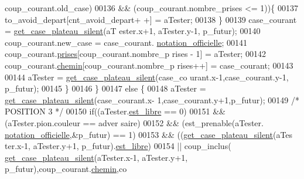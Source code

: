 \begin{DoxyCode}
      coup\_courant.old\_case)
00136                                                 && (coup\_courant.nombre\_prises <=
       1))\{
00137                                                 to\_avoid\_depart[cnt\_avoid\_depart+
      +] = aTester;
00138                                         \}
00139                                         case\_courant = \hyperlink{plateau_8h_a60a8f706865d0ae9087f8d65d4667655}{get_case_plateau_silent}(aT
      ester.x+1, aTester.y-1, p\_futur);
00140                                         coup\_courant.new\_case = case\_courant.
      \hyperlink{structcase__plateau_ad510581b324604a9cf685cbb769a421a}{notation_officielle};
00141                                         coup\_courant.\hyperlink{structcoup_ae19b3a66d3f4e66b8f69a38e4005f44a}{prises}[coup\_courant.nombre\_p
      rises - 1] = aTester;
00142                                         coup\_courant.\hyperlink{structcoup_aa66b88eb8140c2f459ac92fad0796510}{chemin}[coup\_courant.nombre\_p
      rises++] = case\_courant;
00143 
00144                                         aTester = \hyperlink{plateau_8h_a60a8f706865d0ae9087f8d65d4667655}{get_case_plateau_silent}(case\_co
      urant.x-1,case\_courant.y-1, p\_futur);
00145                                 \}
00146                         \}
00147                         \textcolor{keywordflow}{else} \{
00148                                 aTester = \hyperlink{plateau_8h_a60a8f706865d0ae9087f8d65d4667655}{get_case_plateau_silent}(case\_courant.x-
      1,case\_courant.y+1,p\_futur);
00149                                 \textcolor{comment}{/* POSITION 3 */}
00150                                 \textcolor{keywordflow}{if}((aTester.\hyperlink{structcase__plateau_a173f25d2fd7c653d77ca8174ba4f636d}{est_libre} == 0)
00151                                                 && (aTester.pion.couleur == adver
      saire)
00152                                                 && (est\_prenable(aTester.
      \hyperlink{structcase__plateau_ad510581b324604a9cf685cbb769a421a}{notation_officielle},&p\_futur) == 1)
00153                                                 && ((\hyperlink{plateau_8h_a60a8f706865d0ae9087f8d65d4667655}{get_case_plateau_silent}(aTes
      ter.x-1, aTester.y+1, p\_futur).\hyperlink{structcase__plateau_a173f25d2fd7c653d77ca8174ba4f636d}{est_libre})
00154                                                                 || coup\_inclus(
      \hyperlink{plateau_8h_a60a8f706865d0ae9087f8d65d4667655}{get_case_plateau_silent}(aTester.x-1, aTester.y+1, p\_futur),coup\_courant.\hyperlink{structcoup_aa66b88eb8140c2f459ac92fad0796510}{chemin},co

\end{DoxyCode}
